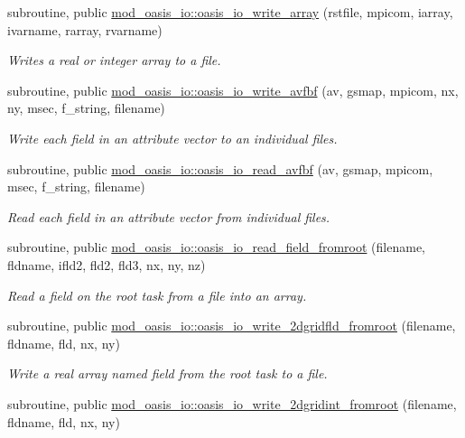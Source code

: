 \begin{DoxyCompactItemize}
subroutine, public \hyperlink{namespacemod__oasis__io_a9ac8ce0ba3223fb59f7f003b50b229cf}{mod\+\_\+oasis\+\_\+io\+::oasis\+\_\+io\+\_\+write\+\_\+array} (rstfile, mpicom, iarray, ivarname, rarray, rvarname)
\begin{DoxyCompactList}\small\item\em Writes a real or integer array to a file. \end{DoxyCompactList}\item 
subroutine, public \hyperlink{namespacemod__oasis__io_a42b325557a774b08d4cba24f387f8b01}{mod\+\_\+oasis\+\_\+io\+::oasis\+\_\+io\+\_\+write\+\_\+avfbf} (av, gsmap, mpicom, nx, ny, msec, f\+\_\+string, filename)
\begin{DoxyCompactList}\small\item\em Write each field in an attribute vector to an individual files. \end{DoxyCompactList}\item 
subroutine, public \hyperlink{namespacemod__oasis__io_ac4a465a698824fb473074bfbd3d92f79}{mod\+\_\+oasis\+\_\+io\+::oasis\+\_\+io\+\_\+read\+\_\+avfbf} (av, gsmap, mpicom, msec, f\+\_\+string, filename)
\begin{DoxyCompactList}\small\item\em Read each field in an attribute vector from individual files. \end{DoxyCompactList}\item 
subroutine, public \hyperlink{namespacemod__oasis__io_af080505b4678a5c68916a700f54ac6e6}{mod\+\_\+oasis\+\_\+io\+::oasis\+\_\+io\+\_\+read\+\_\+field\+\_\+fromroot} (filename, fldname, ifld2, fld2, fld3, nx, ny, nz)
\begin{DoxyCompactList}\small\item\em Read a field on the root task from a file into an array. \end{DoxyCompactList}\item 
subroutine, public \hyperlink{namespacemod__oasis__io_a18912324646473cf8fedd7138cc59a79}{mod\+\_\+oasis\+\_\+io\+::oasis\+\_\+io\+\_\+write\+\_\+2dgridfld\+\_\+fromroot} (filename, fldname, fld, nx, ny)
\begin{DoxyCompactList}\small\item\em Write a real array named field from the root task to a file. \end{DoxyCompactList}\item 
subroutine, public \hyperlink{namespacemod__oasis__io_a432ecb26e0e2d8387c1601ea6cc68668}{mod\+\_\+oasis\+\_\+io\+::oasis\+\_\+io\+\_\+write\+\_\+2dgridint\+\_\+fromroot} (filename, fldname, fld, nx, ny)

\end{DoxyCompactItemize}
